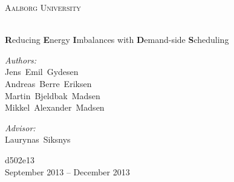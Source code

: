 \newcommand{\HRule}{\rule{\linewidth}{0.5mm}}
\begin{titlingpage}
  \begin{center}
    \vspace*{0.5cm}

    \textsc{\LARGE Aalborg University}\\[1.5cm]

    \vspace{2.5cm}

    {\HUGE \bfseries \productname{}}\\
    \vspace{0.2cm}
    {\small \textbf{R}educing \textbf{E}nergy \textbf{I}mbalances with \textbf{D}emand-side \textbf{S}cheduling \\[0.4cm] }

    \vspace{2.5cm}

    \begin{minipage}[t]{0.4\textwidth}
      \begin{flushleft} \large
        \emph{Authors:}\\
        Jens~Emil~Gydesen\\
        Andreas~Berre~Eriksen\\
        Martin~Bjeldbak~Madsen\\
        Mikkel~Alexander~Madsen
      \end{flushleft}
    \end{minipage}
    \begin{minipage}[t]{0.4\textwidth}
      \begin{flushright} \large
        \emph{Advisor:} \\
        Laurynas~Siksnys
      \end{flushright}
    \end{minipage}

    \vfill

    {\normalsize d502e13}\\
    {\large September 2013 -- December 2013}

  \end{center}
\end{titlingpage}
